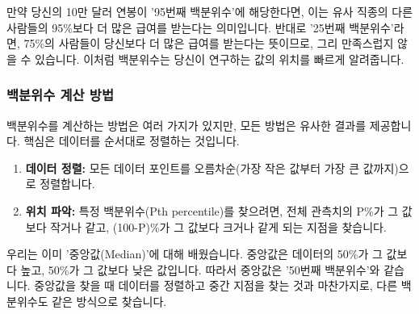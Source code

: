 \documentclass[11pt,a4paper]{article}
\theoremstyle{definition}
\begin{document}
\begin{examplebox}[title=백분위수 예시: 연봉 제안]
만약 당신의 10만 달러 연봉이 '95번째 백분위수'에 해당한다면, 이는 유사 직종의 다른 사람들의 95\%보다 더 많은 급여를 받는다는 의미입니다. 반대로 '25번째 백분위수'라면, 75\%의 사람들이 당신보다 더 많은 급여를 받는다는 뜻이므로, 그리 만족스럽지 않을 수 있습니다. 이처럼 백분위수는 당신이 연구하는 값의 위치를 빠르게 알려줍니다.
\end{examplebox}

\subsubsection*{백분위수 계산 방법}

백분위수를 계산하는 방법은 여러 가지가 있지만, 모든 방법은 유사한 결과를 제공합니다. 핵심은 데이터를 순서대로 정렬하는 것입니다.

\begin{enumerate}
    \item \textbf{데이터 정렬:} 모든 데이터 포인트를 오름차순(가장 작은 값부터 가장 큰 값까지)으로 정렬합니다.
    \item \textbf{위치 파악:} 특정 백분위수(Pth percentile)를 찾으려면, 전체 관측치의 P\%가 그 값보다 작거나 같고, (100-P)\%가 그 값보다 크거나 같게 되는 지점을 찾습니다.
\end{enumerate}

\begin{infobox}[title=중앙값 (Median)과 백분위수]
우리는 이미 '중앙값(Median)'에 대해 배웠습니다. 중앙값은 데이터의 50\%가 그 값보다 높고, 50\%가 그 값보다 낮은 값입니다. 따라서 중앙값은 '50번째 백분위수'와 같습니다. 중앙값을 찾을 때 데이터를 정렬하고 중간 지점을 찾는 것과 마찬가지로, 다른 백분위수도 같은 방식으로 찾습니다.
\end{infobox}
\end{document}
